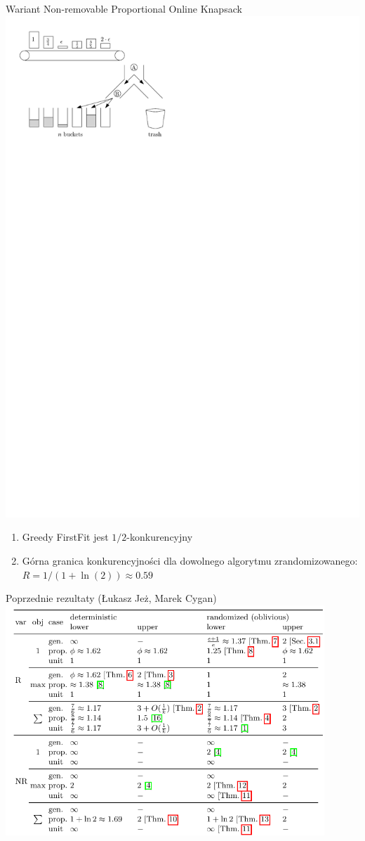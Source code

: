 \documentclass{beamer}
\begin{document}
\begin{frame}{Wariant Non-removable Proportional Online Knapsack}
  \includegraphics{figs/problem_formulation.pdf}
  \begin{enumerate}
    \item Greedy FirstFit jest $1/2$-konkurencyjny
    \item Górna granica konkurencyjności dla dowolnego algorytmu zrandomizowanego: $R = 1/(1+\ln(2)) \approx 0.59$
  \end{enumerate}
\end{frame}


\begin{frame}{Poprzednie rezultaty (Łukasz Jeż, Marek Cygan)}
  \includegraphics[width=0.9\textwidth]{figs/jez-cygan.png}
\end{frame}
\end{document}
